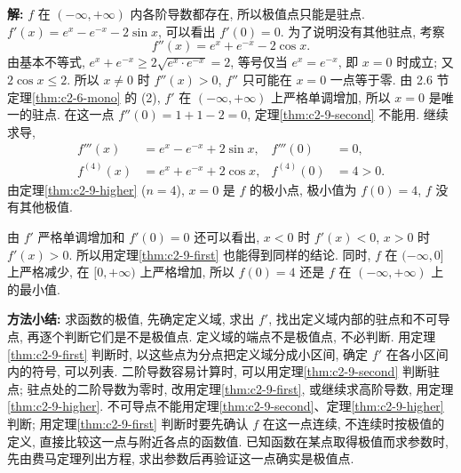 \documentclass[UTF8,openany]{ctexbook}
\theoremstyle{chinesetextbook}
\newenvironment{cnsolution}{\par\indent\textbf{解:} \ignorespaces}{\par}
\begin{document}
\begin{cnsolution}
$f$ 在 $(-\infty,+\infty)$ 内各阶导数都存在, 所以极值点只能是驻点. $f'(x)=e^x-e^{-x}-2\sin x$, 可以看出 $f'(0)=0$. 为了说明没有其他驻点, 考察
\[
f''(x)=e^x+e^{-x}-2\cos x.
\]
由基本不等式, $e^x+e^{-x}\ge2\sqrt{e^x\cdot e^{-x}}=2$, 等号仅当 $e^x=e^{-x}$, 即 $x=0$ 时成立; 又 $2\cos x\le2$. 所以 $x\ne0$ 时 $f''(x)>0$, $f''$ 只可能在 $x=0$ 一点等于零. 由 2.6 节定理\ref{thm:c2-6-mono} 的 (2), $f'$ 在 $(-\infty,+\infty)$ 上严格单调增加, 所以 $x=0$ 是唯一的驻点. 在这一点 $f''(0)=1+1-2=0$, 定理\ref{thm:c2-9-second} 不能用. 继续求导,
\[
\begin{aligned}
f'''(x)&=e^x-e^{-x}+2\sin x,&f'''(0)&=0,\\
f^{(4)}(x)&=e^x+e^{-x}+2\cos x,&f^{(4)}(0)&=4>0.
\end{aligned}
\]
由定理\ref{thm:c2-9-higher} ($n=4$), $x=0$ 是 $f$ 的极小点, 极小值为 $f(0)=4$, $f$ 没有其他极值.
\end{cnsolution}
由 $f'$ 严格单调增加和 $f'(0)=0$ 还可以看出, $x<0$ 时 $f'(x)<0$, $x>0$ 时 $f'(x)>0$. 所以用定理\ref{thm:c2-9-first} 也能得到同样的结论. 同时, $f$ 在 $(-\infty,0]$ 上严格减少, 在 $[0,+\infty)$ 上严格增加, 所以 $f(0)=4$ 还是 $f$ 在 $(-\infty,+\infty)$ 上的最小值.
\par\indent\textbf{方法小结:} 求函数的极值, 先确定定义域, 求出 $f'$, 找出定义域内部的驻点和不可导点, 再逐个判断它们是不是极值点. 定义域的端点不是极值点, 不必判断. 用定理\ref{thm:c2-9-first} 判断时, 以这些点为分点把定义域分成小区间, 确定 $f'$ 在各小区间内的符号, 可以列表. 二阶导数容易计算时, 可以用定理\ref{thm:c2-9-second} 判断驻点; 驻点处的二阶导数为零时, 改用定理\ref{thm:c2-9-first}, 或继续求高阶导数, 用定理\ref{thm:c2-9-higher}. 不可导点不能用定理\ref{thm:c2-9-second}、定理\ref{thm:c2-9-higher} 判断; 用定理\ref{thm:c2-9-first} 判断时要先确认 $f$ 在这一点连续, 不连续时按极值的定义, 直接比较这一点与附近各点的函数值. 已知函数在某点取得极值而求参数时, 先由费马定理列出方程, 求出参数后再验证这一点确实是极值点.
\end{document}
